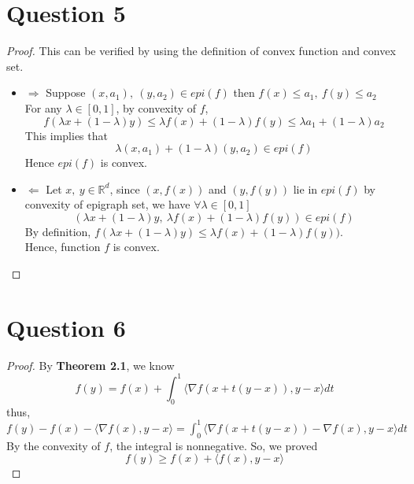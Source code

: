 \documentclass{article}
\begin{document}
\section*{Question 5}
    \begin{proof}
        This can be verified by using the definition of convex function and convex set.
        \begin{itemize}
            \item $\Rightarrow$
                Suppose $(x,a_1),\ (y,a_2) \in epi(f)$ then $f(x)\leqslant a_1,\ f(y)\leqslant a_2$ \\
                For any $\lambda \in [0,1]$, by convexity of $f$,
                $$f(\lambda x + (1-\lambda)y) \leqslant \lambda f(x) + (1-\lambda) f(y) \leqslant \lambda a_1 + (1-\lambda) a_2$$
                This implies that $$\lambda (x, a_1) + (1-\lambda) (y, a_2) \in epi(f)$$
                Hence $epi(f)$ is convex.
            \item $\Leftarrow$
                Let $x,\ y \in \mathbb{R}^d$, since $(x, f(x))$ and $(y, f(y))$ lie in $epi(f)$
                by convexity of epigraph set, we have
                $\forall \lambda \in [0,1]$
                $$(\lambda x+(1-\lambda)y,\ \lambda f(x) + (1-\lambda)f(y)) \in epi(f)$$
                By definition, $f(\lambda x+(1-\lambda)y) \leqslant \lambda f(x) + (1-\lambda)f(y))$.\\
                Hence, function $f$ is convex.
        \end{itemize}
    \end{proof}

\section*{Question 6}
    \begin{proof}
        By \textbf{Theorem 2.1}, we know
        $$f(y) = f(x) + \int_0^1 \langle\nabla f\left(x+t(y-x)\right), y-x\rangle dt$$
        thus, $f(y)-f(x)-\langle\nabla f(x), y-x\rangle = \int_0^1 \langle\nabla f\left(x+t(y-x)\right)-\nabla f(x), y-x\rangle dt$\\
        By the convexity of $f$, the integral is nonnegative. So, we proved
        $$f(y) \geqslant f(x) + \langle f(x), y-x\rangle$$
    \end{proof}

\end{document}
